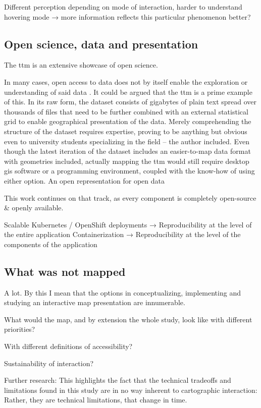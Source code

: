 Different perception depending on mode of interaction,
harder to understand hovering mode →
more information reflects this particular phenomenon better?


\subsection{Open science, data and presentation}
The \acrshort{ttm} is an extensive showcase of open science.


In many cases, open access to data does not by itself enable
the exploration or understanding of said data \parencite{obr2016}.
It could be argued that the \acrshort{ttm} is a prime example of this.
In its raw form,
the dataset consists of gigabytes of plain text spread over thousands of files
that need to be further combined with an external statistical grid to enable
geographical presentation of the data.
Merely comprehending the structure of the dataset requires expertise,
proving to be anything but obvious even to university students specializing in the field
-- the author included.
Even though the latest iteration of the dataset \parencite{fin2023}
includes an easier-to-map data format with geometries included,
actually mapping the \acrshort{ttm} would still require
desktop \acrshort{gis} software or a programming environment,
coupled with the know-how of using either option.
An open representation for open data

This work continues on that track,
as every component is completely open-source \& openly available.

Scalable Kubernetes / OpenShift deployments → Reproducibility at the level of the entire application
Containerization → Reproducibility at the level of the components of the application

\subsection{What was not mapped}

A lot. By this I mean that the options in
conceptualizing, implementing and studying an interactive map presentation are innumerable.

What would the map, and by extension the whole study, look like with different priorities?

With different definitions of accessibility?

Sustainability of interaction?

Further research:
This highlights the fact that the technical tradeoffs and limitations found in this study
are in no way inherent to cartographic interaction:
Rather, they are technical limitations, that change in time.
